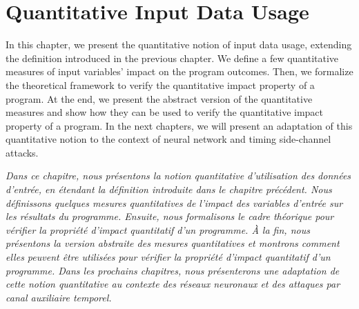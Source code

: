 %

\chapter{Quantitative Input Data Usage}


In this chapter, we present the quantitative notion of input data usage, extending the definition introduced in the previous chapter.
We define a few quantitative measures of input variables' impact on the program outcomes.
Then, we formalize the theoretical framework to verify the quantitative impact property of a program.
At the end, we present the abstract version of the quantitative measures and show how they can be used to verify the quantitative impact property of a program.
In the next chapters, we will present an adaptation of this quantitative notion to the context of neural network and timing side-channel attacks.

\emph{Dans ce chapitre, nous présentons la notion quantitative d'utilisation des données d'entrée, en étendant la définition introduite dans le chapitre précédent. Nous définissons quelques mesures quantitatives de l'impact des variables d'entrée sur les résultats du programme. Ensuite, nous formalisons le cadre théorique pour vérifier la propriété d'impact quantitatif d'un programme. À la fin, nous présentons la version abstraite des mesures quantitatives et montrons comment elles peuvent être utilisées pour vérifier la propriété d'impact quantitatif d'un programme. Dans les prochains chapitres, nous présenterons une adaptation de cette notion quantitative au contexte des réseaux neuronaux et des attaques par canal auxiliaire temporel.}



